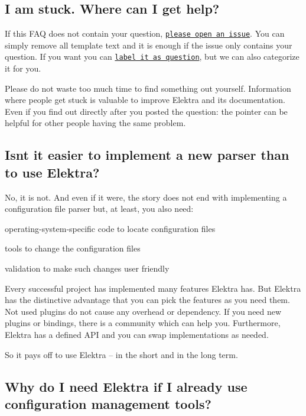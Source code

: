 \subsection*{I am stuck. Where can I get help?}

If this F\+AQ does not contain your question, \href{https://git.libelektra.org/issues}{\tt please open an issue}. You can simply remove all template text and it is enough if the issue only contains your question. If you want you can \href{https://git.libelektra.org/issues/labels/question}{\tt label it as question}, but we can also categorize it for you.

Please do not waste too much time to find something out yourself. Information where people get stuck is valuable to improve Elektra and its documentation. Even if you find out directly after you posted the question\+: the pointer can be helpful for other people having the same problem.

\subsection*{Isn\textquotesingle{}t it easier to implement a new parser than to use Elektra?}

No, it is not. And even if it were, the story does not end with implementing a configuration file parser but, at least, you also need\+:


\begin{DoxyItemize}
\item operating-\/system-\/specific code to locate configuration files
\item tools to change the configuration files
\item validation to make such changes user friendly
\end{DoxyItemize}

Every successful project has implemented many features Elektra has. But Elektra has the distinctive advantage that you can pick the features as you need them. Not used plugins do not cause any overhead or dependency. If you need new plugins or bindings, there is a community which can help you. Furthermore, Elektra has a defined A\+PI and you can swap implementations as needed.

So it pays off to use Elektra -- in the short and in the long term.

\subsection*{Why do I need Elektra if I already use configuration management tools?}

